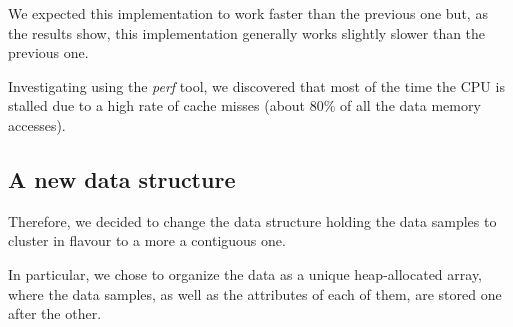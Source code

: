 \documentclass{article}
\begin{document}
We expected this implementation to work faster than the previous one but, as the results show,
this implementation generally works slightly slower than the previous one.

Investigating using the \textit{perf} tool, we discovered that most of the time the CPU is
stalled due to a high rate of cache misses (about 80\% of all the data memory accesses).

\hypertarget{a-new-data-structure}{%
\subsection{A new data structure}\label{a-new-data-structure}}

Therefore, we decided to change the data structure holding the data samples to cluster in flavour
to a more a contiguous one.

In particular, we chose to organize the data as a unique heap-allocated array, where the data
samples, as well as the attributes of each of them, are stored one after the other.

\end{document}
